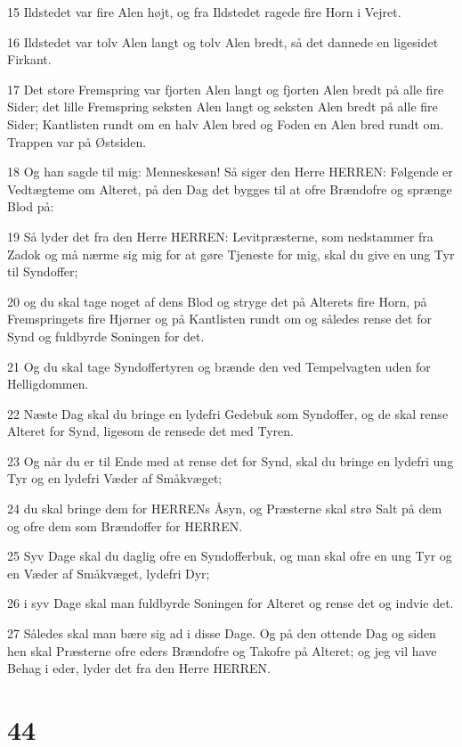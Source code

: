 \par 15 Ildstedet var fire Alen højt, og fra Ildstedet ragede fire Horn i Vejret.
\par 16 Ildstedet var tolv Alen langt og tolv Alen bredt, så det dannede en ligesidet Firkant.
\par 17 Det store Fremspring var fjorten Alen langt og fjorten Alen bredt på alle fire Sider; det lille Fremspring seksten Alen langt og seksten Alen bredt på alle fire Sider; Kantlisten rundt om en halv Alen bred og Foden en Alen bred rundt om. Trappen var på Østsiden.
\par 18 Og han sagde til mig: Menneskesøn! Så siger den Herre HERREN: Følgende er Vedtægteme om Alteret, på den Dag det bygges til at ofre Brændofre og sprænge Blod på:
\par 19 Så lyder det fra den Herre HERREN: Levitpræsterne, som nedstammer fra Zadok og må nærme sig mig for at gøre Tjeneste for mig, skal du give en ung Tyr til Syndoffer;
\par 20 og du skal tage noget af dens Blod og stryge det på Alterets fire Horn, på Fremspringets fire Hjørner og på Kantlisten rundt om og således rense det for Synd og fuldbyrde Soningen for det.
\par 21 Og du skal tage Syndoffertyren og brænde den ved Tempelvagten uden for Helligdommen.
\par 22 Næste Dag skal du bringe en lydefri Gedebuk som Syndoffer, og de skal rense Alteret for Synd, ligesom de rensede det med Tyren.
\par 23 Og når du er til Ende med at rense det for Synd, skal du bringe en lydefri ung Tyr og en lydefri Væder af Småkvæget;
\par 24 du skal bringe dem for HERRENs Åsyn, og Præsterne skal strø Salt på dem og ofre dem som Brændoffer for HERREN.
\par 25 Syv Dage skal du daglig ofre en Syndofferbuk, og man skal ofre en ung Tyr og en Væder af Småkvæget, lydefri Dyr;
\par 26 i syv Dage skal man fuldbyrde Soningen for Alteret og rense det og indvie det.
\par 27 Således skal man bære sig ad i disse Dage. Og på den ottende Dag og siden hen skal Præsterne ofre eders Brændofre og Takofre på Alteret; og jeg vil have Behag i eder, lyder det fra den Herre HERREN.

\chapter{44}

